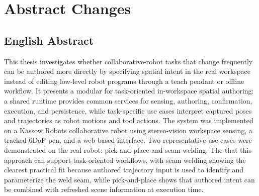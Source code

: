 \chapter*{Abstract Changes}

\section*{English Abstract}
%
This thesis investigates whether collaborative-robot tasks that change frequently can be authored more directly by specifying spatial intent in the real workspace instead of editing low-level robot programs through a teach pendant or offline workflow.
It presents a modular \DIFdelbegin {}\DIFdelend \DIFaddbegin {}\DIFaddend for task-oriented in-workspace spatial authoring: a shared runtime provides common services for sensing, authoring, confirmation, execution, and persistence, while task-specific use cases interpret captured poses and trajectories as robot motions and tool actions.
The system was implemented on a Kassow Robots collaborative robot using stereo-vision workspace sensing, a tracked 6DoF pen, and a web-based interface.
Two representative use cases were demonstrated on the real robot: pick-and-place and seam welding.
The \DIFdelbegin {}\DIFdelend \DIFaddbegin {}\DIFaddend that this approach can support \DIFdelbegin {}\DIFdelend task-oriented workflows, with seam welding showing the clearest practical fit because authored trajectory input is used to identify and parameterize the weld seam, while pick-and-place \DIFdelbegin {}\DIFdelend shows that authored intent can be combined with refreshed scene information at execution time\DIFdelbegin {}\DIFdelend .

